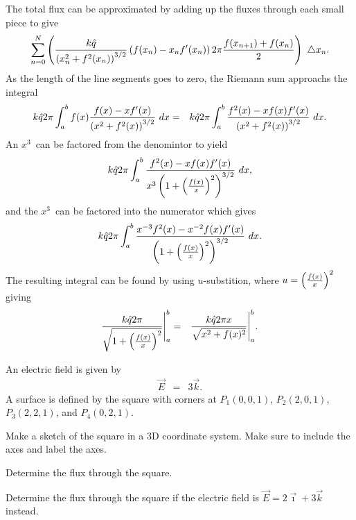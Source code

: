 The total flux can be approximated by adding up the fluxes through
each small piece to give
\begin{eqnarray*}
  \sum_{n=0}^N \left( \frac{k\hat{q}}{\left( x_n^2+f^2(x_n)\right)^{3/2} }
  \left( f(x_n) - x_n f'(x_n) \right) 2 \pi \frac{f(x_{n+1})+f(x_n)}{2} \right)
  ~ \triangle x_n.
\end{eqnarray*}
As the length of the line segments goes to zero, the Riemann sum
approachs the integral
\begin{eqnarray*}
  k\hat{q}2\pi \int^b_a f(x)\frac{f(x)-xf'(x)}{\left( x^2+f^2(x) \right)^{3/2}}
     ~ dx & = &
     k\hat{q}2\pi \int^b_a \frac{f^2(x)-xf(x)f'(x)}{\left( x^2+f^2(x)
       \right)^{3/2}} ~ dx.
\end{eqnarray*}
An $x^3$\ can be factored from the denomintor to yield
\begin{eqnarray*}
  k\hat{q}2\pi \int^b_a \frac{f^2(x)-xf(x)f'(x)}{x^3 \left(
    1+\left( \frac{f(x)}{x} \right)^2 \right)^{3/2}} ~ dx,
\end{eqnarray*}
and the $x^3$\ can be factored into the numerator which gives
\begin{eqnarray*}
  k\hat{q}2\pi \int^b_a \frac{x^{-3}f^2(x)-x^{-2}f(x)f'(x)}{\left(
    1+\left( \frac{f(x)}{x} \right)^2 \right)^{3/2}} ~ dx.
\end{eqnarray*}
The resulting integral can be found by using $u$-substition, where
$u=\left( \frac{f(x)}{x} \right)^2$ giving
\begin{eqnarray*}
    \frac{k\hat{q}2\pi}{\sqrt{1+\left( \frac{f(x)}{x} \right)^2 }}
     \Bigg|^b_a
     & = & \frac{k\hat{q}2\pi x}{\sqrt{x^2 + f(x)^2}}
     \Bigg|^b_a.
\end{eqnarray*}




\begin{problem}
\item An electric field is given by
\begin{eqnarray*}
  \vec{E} & = & 3 \vec{k}.
\end{eqnarray*}
A surface is defined by the square with corners at $P_1(0,0,1)$, $P_2(2,0,1)$, $P_3(2,2,1)$, and $P_4(0,2,1)$.
\begin{subproblem}
  \item Make a sketch of the square in a 3D coordinate system. Make sure to include the axes and label the axes.
    \vfill
  \item Determine the flux through the square.
    \vfill
  \item Determine the flux through the square if the electric field is $\vec{E} = 2\vec{\imath} + 3\vec{k}$ instead.
    \vfill
\end{subproblem}
\end{problem}


